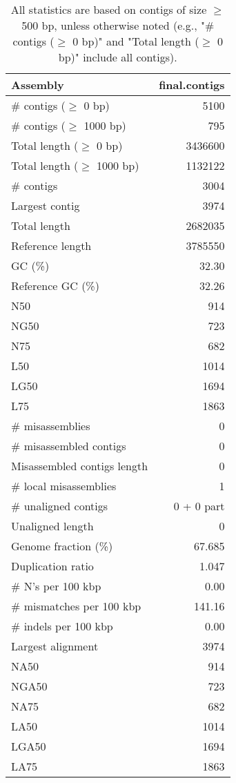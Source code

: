 \documentclass[12pt,a4paper]{article}
\begin{document}
\begin{table}[ht]
\begin{center}
\caption{All statistics are based on contigs of size $\geq$ 500 bp, unless otherwise noted (e.g., "\# contigs ($\geq$ 0 bp)" and "Total length ($\geq$ 0 bp)" include all contigs).}
\begin{tabular}{|l*{1}{|r}|}
\hline
Assembly & final.contigs \\ \hline
\# contigs ($\geq$ 0 bp) & 5100 \\ \hline
\# contigs ($\geq$ 1000 bp) & 795 \\ \hline
Total length ($\geq$ 0 bp) & 3436600 \\ \hline
Total length ($\geq$ 1000 bp) & 1132122 \\ \hline
\# contigs & 3004 \\ \hline
Largest contig & 3974 \\ \hline
Total length & 2682035 \\ \hline
Reference length & 3785550 \\ \hline
GC (\%) & 32.30 \\ \hline
Reference GC (\%) & 32.26 \\ \hline
N50 & 914 \\ \hline
NG50 & 723 \\ \hline
N75 & 682 \\ \hline
L50 & 1014 \\ \hline
LG50 & 1694 \\ \hline
L75 & 1863 \\ \hline
\# misassemblies & 0 \\ \hline
\# misassembled contigs & 0 \\ \hline
Misassembled contigs length & 0 \\ \hline
\# local misassemblies & 1 \\ \hline
\# unaligned contigs & 0 + 0 part \\ \hline
Unaligned length & 0 \\ \hline
Genome fraction (\%) & 67.685 \\ \hline
Duplication ratio & 1.047 \\ \hline
\# N's per 100 kbp & 0.00 \\ \hline
\# mismatches per 100 kbp & 141.16 \\ \hline
\# indels per 100 kbp & 0.00 \\ \hline
Largest alignment & 3974 \\ \hline
NA50 & 914 \\ \hline
NGA50 & 723 \\ \hline
NA75 & 682 \\ \hline
LA50 & 1014 \\ \hline
LGA50 & 1694 \\ \hline
LA75 & 1863 \\ \hline
\end{tabular}
\end{center}
\end{table}
\end{document}
